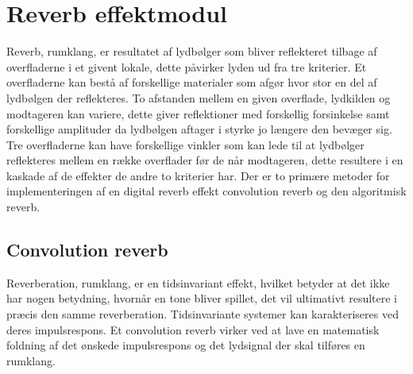 \section{Reverb effektmodul}\label{sec:reverb}
Reverb, rumklang, er resultatet af lydbølger som bliver reflekteret tilbage af %
overfladerne i et givent lokale, dette påvirker lyden ud fra tre kriterier.\newline 
Et overfladerne kan bestå af forskellige materialer som afgør hvor stor en del af lydbølgen der reflekteres.\newline 
To afstanden mellem en given overflade, lydkilden og modtageren kan variere, dette giver reflektioner med forskellig forsinkelse samt forskellige amplituder da lydbølgen aftager i styrke jo længere den bevæger sig.\newline 
Tre overfladerne kan have forskellige vinkler som kan lede til at lydbølger reflekteres mellem en række overflader før de når modtageren, dette resultere i en kaskade af de effekter de andre to kriterier har.\newline
Der er to primære metoder for implementeringen af en digital reverb effekt convolution reverb og den algoritmisk reverb.
\subsection{Convolution reverb}
Reverberation, rumklang, er en tidsinvariant effekt, hvilket betyder at det ikke har nogen betydning, hvornår en tone bliver spillet, det vil ultimativt resultere i præcis den samme reverberation. \newline
Tidsinvariante systemer kan karakteriseres ved deres impulsrespons.
Et convolution reverb virker ved at lave en matematisk foldning af det ønskede %
impulsrespons og det lydsignal der skal tilføres en rumklang.\newline 

